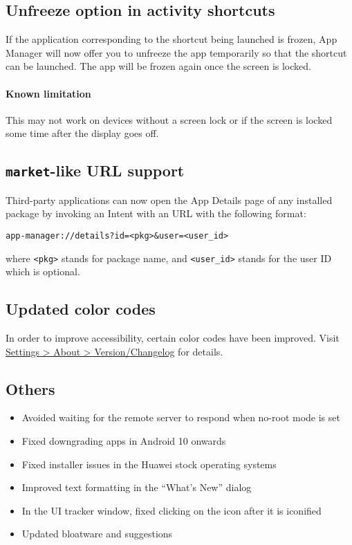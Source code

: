\subsection{Unfreeze option in activity shortcuts}
If the application corresponding to the shortcut being launched is frozen, App Manager will now
offer you to unfreeze the app temporarily so that the shortcut can be launched. The app will be
frozen again once the screen is locked.

\paragraph{Known limitation} This may not work on devices without a screen lock or if the screen is
locked some time after the display goes off.

\subsection{\texttt{market}-like URL support}
Third-party applications can now open the App Details page of any installed package by invoking an
Intent with an URL with the following format:

\begin{verbatim}
app-manager://details?id=<pkg>&user=<user_id>
\end{verbatim}

where \texttt{<pkg>} stands for package name, and \texttt{<user\_id>} stands for the user ID which
is optional.

\subsection{Updated color codes}
In order to improve accessibility, certain color codes have been improved. Visit
\href{app-manager://settings/about/version}{Settings > About > Version/Changelog} for details.

\subsection{Others}
\begin{itemize}
    \item Avoided waiting for the remote server to respond when no-root mode is set
    \item Fixed downgrading apps in Android 10 onwards
    \item Fixed installer issues in the Huawei stock operating systems
    \item Improved text formatting in the ``What's New'' dialog
    \item In the UI tracker window, fixed clicking on the icon after it is iconified
    \item Updated bloatware and suggestions
\end{itemize}

